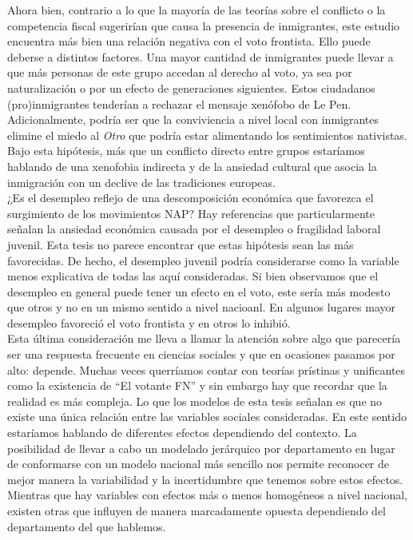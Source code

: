 Ahora bien, contrario a lo que la mayoría de las teorías sobre el conflicto o la competencia fiscal sugerirían que causa la presencia de inmigrantes, este estudio encuentra más bien una relación negativa con el voto frontista. Ello puede deberse a distintos factores. Una mayor cantidad de inmigrantes puede llevar a que más personas de este grupo accedan al derecho al voto, ya sea por naturalización o por un efecto de generaciones siguientes. Estos ciudadanos (pro)inmigrantes tenderían a rechazar el mensaje xenófobo de Le Pen. Adicionalmente, podría ser que la conviviencia a nivel local con inmigrantes elimine el miedo al \textit{Otro} que podría estar alimentando los sentimientos nativistas. Bajo esta hipótesis, más que un conflicto directo entre grupos estaríamos hablando de una xenofobia indirecta y de la ansiedad cultural que asocia la inmigración con un declive de las tradiciones europeas.\\

¿Es el desempleo reflejo de una descomposición económica que favorezca el surgimiento de los movimientos NAP? Hay referencias que particularmente señalan la ansiedad económica causada por el desempleo o fragilidad laboral juvenil. Esta tesis no parece encontrar que estas hipótesis sean las más favorecidas. De hecho, el desempleo juvenil podría considerarse como la variable menos explicativa de todas las aquí consideradas. Si bien observamos que el desempleo en general puede tener un efecto en el voto, este sería más modesto que otros y no en un mismo sentido a nivel nacioanl. En algunos lugares mayor desempleo favoreció el voto frontista y en otros lo inhibió.\\

Esta última consideración me lleva a llamar la atención sobre algo que parecería ser una respuesta frecuente en ciencias sociales y que en ocasiones pasamos por alto: depende. Muchas veces querríamos contar con teorías prístinas y unificantes como la existencia de ``El votante FN'' y sin embargo hay que recordar que la realidad es más compleja. Lo que los modelos de esta tesis señalan es que no existe una única relación entre las variables sociales consideradas. En este sentido estaríamos hablando de diferentes efectos dependiendo del contexto. La posibilidad de llevar a cabo un modelado jerárquico por departamento en lugar de conformarse con un modelo nacional más sencillo nos permite reconocer de mejor manera la variabilidad y la incertidumbre que tenemos sobre estos efectos. Mientras que hay variables con efectos más o menos homogéneos a nivel nacional, existen otras que influyen de manera marcadamente opuesta dependiendo del departamento del que hablemos.

